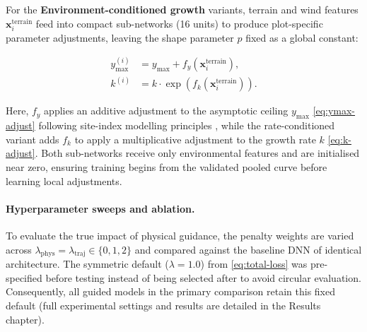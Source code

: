 \documentclass[11pt,a4paper]{report}
\begin{document}
For the \textbf{Environment-conditioned growth} variants, terrain and wind features $\mathbf{x}^{\text{terrain}}_i$ feed into compact sub-networks (16 units) to produce plot-specific parameter adjustments, leaving the shape parameter $p$ fixed as a global constant:

\begin{subequations}
\label{eq:env-adjustments}
\begin{align}
y_{\max}^{(i)} &= y_{\max} + f_{y}\!\left(\mathbf{x}^{\text{terrain}}_i\right), \label{eq:ymax-adjust} \\
k^{(i)} &= k \cdot \exp\!\left(f_{k}\!\left(\mathbf{x}^{\text{terrain}}_i\right)\right). \label{eq:k-adjust}
\end{align}
\end{subequations}

Here, $f_y$ applies an additive adjustment to the asymptotic ceiling $y_{\max}$ \eqref{eq:ymax-adjust} following site-index modelling principles \citep{socha2023Higher_C1_SS}, while the rate-conditioned variant adds $f_k$ to apply a multiplicative adjustment to the growth rate $k$ \eqref{eq:k-adjust}. Both sub-networks receive only environmental features and are initialised near zero, ensuring training begins from the validated pooled curve before learning local adjustments.

\paragraph*{Hyperparameter sweeps and ablation.} To evaluate the true impact of physical guidance, the penalty weights are varied across $\lambda_{\text{phys}} = \lambda_{\text{traj}} \in \{0, 1, 2\}$ and compared against the baseline DNN of identical architecture. The symmetric default ($\lambda = 1.0$) from \eqref{eq:total-loss} was pre-specified before testing instead of being selected after to avoid circular evaluation. Consequently, all guided models in the primary comparison retain this fixed default (full experimental settings and results are detailed in the Results chapter).
\end{document}
